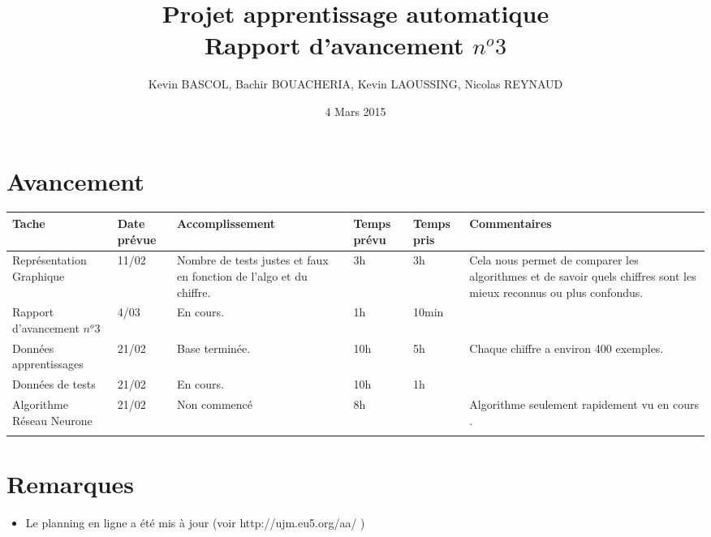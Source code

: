 \documentclass[10pt,a4paper, landscape]{report}
\author{Kevin BASCOL, Bachir BOUACHERIA, Kevin LAOUSSING, Nicolas REYNAUD}
\title{Projet apprentissage automatique\\Rapport d'avancement $n^o 3$}
\date{\vfill 4 Mars 2015}
\begin{document}
\maketitle

\section*{Avancement}
\begin{center}
	\bgroup
	\def\arraystretch{1.5}
	\begin{tabular}{|p{7cm}|p{1cm}|p{7cm}|p{2cm}|p{2cm}|p{7cm}|}
		\hline
		\rowcolor{gris}Tache & Date prévue & Accomplissement & Temps prévu & Temps pris & Commentaires\\
		\hline
		Représentation Graphique & 11/02 & Nombre de tests justes et faux en fonction de l'algo et du chiffre. & 3h & 3h & Cela nous permet de comparer les algorithmes et de savoir quels chiffres sont les mieux reconnus ou plus confondus. \\
		\hline
		Rapport d'avancement $n^o 3$ & 4/03 & En cours. & 1h & 10min & \\
		\hline
		Données apprentissages & 21/02 & Base terminée. & 10h & 5h & Chaque chiffre a environ 400 exemples.\\
		\hline
		Données de tests & 21/02 & En cours. & 10h & 1h & \\
		\hline
		Algorithme Réseau Neurone & 21/02 & Non commencé & 8h & & Algorithme seulement rapidement vu en cours . \\
		\hline
		\rowcolor{gris} & & & & & \\
		\hline
	\end{tabular}
	\egroup
\end{center}

\section*{Remarques}
\begin{itemize}
\item Le planning en ligne a été mis à jour (voir http://ujm.eu5.org/aa/ )
\end{itemize}
\end{document}
